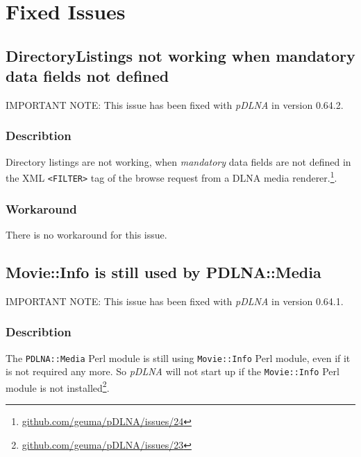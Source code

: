 %
%

\chapter{Fixed Issues}
\label{fixedissues}

\section{DirectoryListings not working when mandatory data fields not defined}

\begin{colframeimportantnote}
\textsc{IMPORTANT NOTE:} This issue has been fixed with {\em pDLNA} in version 0.64.2.
\end{colframeimportantnote}

\subsection{Describtion}

Directory listings are not working, when {\em mandatory} data fields are not defined in the XML \verb|<FILTER>| tag of the browse request from a DLNA media renderer.\footnote{\url{github.com/geuma/pDLNA/issues/24}}.

\subsection{Workaround}

There is no workaround for this issue.

\section{Movie::Info is still used by PDLNA::Media}

\begin{colframeimportantnote}
\textsc{IMPORTANT NOTE:} This issue has been fixed with {\em pDLNA} in version 0.64.1.
\end{colframeimportantnote}

\subsection{Describtion}

The \verb|PDLNA::Media| Perl module is still using \verb|Movie::Info| Perl module, even if it is not required any more. So {\em pDLNA} will not start up if the \verb|Movie::Info| Perl module is not installed\footnote{\url{github.com/geuma/pDLNA/issues/23}}.

